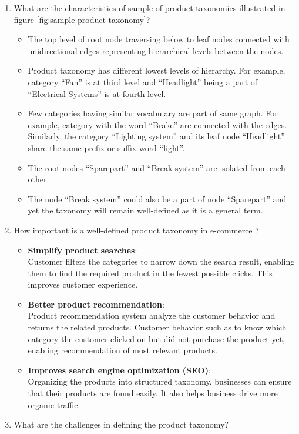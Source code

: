 \begin{enumerate}[label=\textbf{Q\arabic*:}]
    \item What are the characteristics of sample of product taxonomies illustrated in figure \ref{fig:sample-product-taxonomy}?
    

    \begin{itemize}
        \item The top level of root node traversing below to leaf nodes connected with unidirectional edges representing hierarchical levels between the nodes. 
        \item Product taxonomy has different lowest levels of hierarchy. For example, category ``Fan'' is at third level and ``Headlight'' being a part of ``Electrical Systems'' is at fourth level.
        \item Few categories having similar vocabulary are part of same graph. For example, category with the word ``Brake'' are connected with the edges.  Similarly, the category ``Lighting system'' and its leaf node ``Headlight'' share the same prefix or suffix word ``light''.
        \item The root nodes ``Sparepart'' and ``Break system'' are isolated from each other.  
        \item The node ``Break system'' could also be a part of node ``Sparepart'' and yet the taxonomy will remain well-defined as it is a general term.
        
    \end{itemize}
    
    \clearpage
    
    \item How important is a well-defined product taxonomy in e-commerce \parencite{JessicaHoward.}?
    \begin{itemize}
        \item \textbf{Simplify product searches}:\\ Customer filters the categories to narrow down the search result, enabling them to find the required product in the fewest possible clicks. This improves customer experience.
        \item \textbf{Better product recommendation}:\\ Product recommendation system analyze the customer behavior and returns the related products. Customer behavior such as to know which category the customer clicked on but did not purchase the product yet, enabling recommendation of most relevant products. 
        \item \textbf{Improves search engine optimization (SEO)}:\\  Organizing the products into structured taxonomy, businesses can ensure that their products are found easily. It also helps business drive more organic traffic. 
    \end{itemize}
    \item What are the challenges in defining the product taxonomy?     


\end{enumerate}

